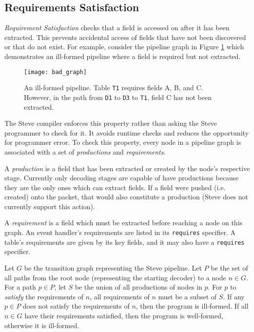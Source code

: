 \subsection{Requirements Satisfaction} \label{guide:requirements}

\textit{Requirement Satisfaction} checks that a field is accessed on after it has been extracted. This prevents accidental access of fields that have not been discovered or that do not exist. For example, consider the pipeline graph in Figure \ref{fig:bad_graph} which demonstrates an ill-formed pipeline where a field is required but not extracted.

\begin{figure}[ht]
\texttt{[image: bad\_graph]}
\caption{An ill-formed pipeline. Table \texttt{T1} requires fields A, B, and C. However, in the path from \texttt{D1} to \texttt{D3} to \texttt{T1}, field C has not been extracted.}
\label{fig:bad_graph}
\end{figure}

The Steve compiler enforces this
property rather than asking the Steve programmer to check for it.
It avoids runtime checks and reduces the opportunity for programmer error.
To check this property, 
every node in a pipeline graph is associated with a set of \textit{productions} and \textit{requirements}.

A \textit{production} is a field that has been extracted or created by the node's respective stage. Currently only decoding stages are capable of have productions because they are the only ones which can extract fields. If a field were pushed (i.e. created) onto the packet, that would also constitute a production (Steve does not currently support this action).

A \emph{requirement} is a field which must be extracted before reaching a node on
this graph. An event handler's requirements are listed in its
\texttt{requires} specifier. A table's requirements are given by its
key fields, and it may also have a \texttt{requires} specifier.

Let $G$ be the transition graph representing the Steve pipeline.
Let $P$ be the set of all paths from the root node (representing the starting decoder) to a node $n \in G$. 
For a path $p \in P$, let $S$ be the union of all productions of nodes in $p$. 
For $p$ to \emph{satisfy} the requirements of $n$, 
all requirements of $n$ must be a subset of $S$.
If any $p \in P$ does not satisfy the requirements of $n$, then the program
is ill-formed. If all $n \in G$ have their requirements
satisfied, then the program is well-formed, otherwise it is ill-formed.

